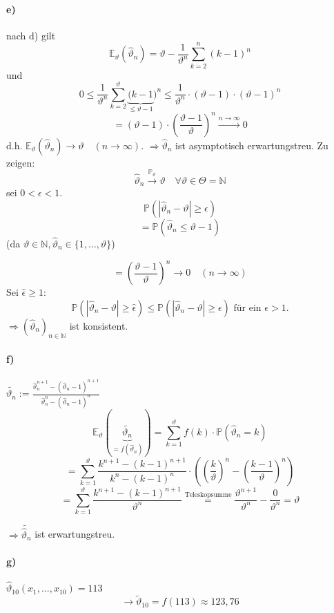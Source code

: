 \documentclass[a4paper,11pt,notitlepage]{report}
\newcommand{\N}{{\ensuremath{\mathbb{N}}}}
\newcommand{\Prim}{{\ensuremath{\mathbb{P}}}}
\newcommand{\E}{{\ensuremath{\mathbb{E}}}}
\begin{document}
\paragraph{e)}
nach d) gilt
$$\E_\vartheta(\hat{\vartheta}_n) = \vartheta - \frac{1}{\vartheta^n} \sum\limits_{k=2}^n{(k-1)^n}$$
und
$$0 \leq \frac{1}{\vartheta^n} \sum\limits_{k=2}^{\vartheta}{\underbrace{(k-1}_{\leq \vartheta-1})^n \leq \frac{1}{\vartheta^n} \cdot (\vartheta-1) \cdot (\vartheta-1)^n}$$
$$= (\vartheta-1) \cdot (\frac{\vartheta-1}{\vartheta})^n \overset{n \rightarrow \infty}{\rightarrow} 0$$
d.h. $\E_\vartheta(\hat{\vartheta}_n) \rightarrow \vartheta \quad (n \rightarrow \infty)$. \newline
$\Rightarrow \hat{\vartheta}_n$
 ist asymptotisch erwartungstreu.
 \newline
 Zu zeigen:
 $$\hat{\vartheta}_n \overset{\Prim_\vartheta}{\rightarrow} \vartheta \quad \forall \vartheta \in \Theta = \N$$
 sei $0 < \epsilon < 1$.
 $$\Prim(|\hat{\vartheta}_n - \vartheta| \geq \epsilon)$$
 $$= \Prim(\hat{\vartheta}_n \leq \vartheta - 1)$$
 (da $\vartheta \in \N, \hat{\vartheta}_n \in \{1, \ldots, \vartheta\}$)
 
 $$= (\frac{\vartheta-1}{\vartheta})^n \rightarrow 0 \quad (n \rightarrow \infty)$$
 Sei $\hat{\epsilon} \geq 1:$
 $$\Prim(|\hat{\vartheta}_n- \vartheta|  \geq \hat{\epsilon}) \leq \Prim(|\hat{\vartheta}_n - \vartheta| \geq \epsilon) \text{ für ein } \epsilon> 1.$$
 $\Rightarrow (\hat{\vartheta}_n)_{n \in \N}$ ist konsistent.
 
 \paragraph{f)}
 $\widetilde{\vartheta_n} := \frac{\hat{\vartheta}_n^{n+1}- (\hat{\vartheta}_n -1)^{n+1}}{\hat{\vartheta}_n^n - (\hat{\vartheta}_n - 1)^n}$
 $$\E_\vartheta(\underbrace{\widetilde{\vartheta_n}}_{= f(\hat{\vartheta}_n)}) = \sum\limits_{k=1}^{\vartheta}{f(k) \cdot \Prim(\hat{\vartheta}_n = k)}$$
 $$= \sum\limits_{k=1}^{\vartheta}{\frac{k^{n+1}- (k-1)^{n+1}}{k^n - (k-1)^n} \cdot ((\frac{k}{\vartheta})^n - (\frac{k-1}{\vartheta})^n)}$$
 $$= \sum\limits_{k=1}^\vartheta{\frac{k^{n+1} - (k-1)^{n+1}}{\vartheta^n}} \overset{\text{Teleskopsumme}}{=} \frac{\vartheta^{n+1}}{\vartheta^n} - \frac{0}{\vartheta^n} = \vartheta$$
 
 $\Rightarrow \widetilde{\hat{\vartheta}_n}$ ist erwartungstreu.
 
 \paragraph{g)}
 $\hat{\vartheta}_{10}(x_1, \ldots, x_{10}) = 113$
 $$\rightarrow \widetilde{\vartheta}_{10} = f(113) \approx 123,76$$
 
\end{document}
